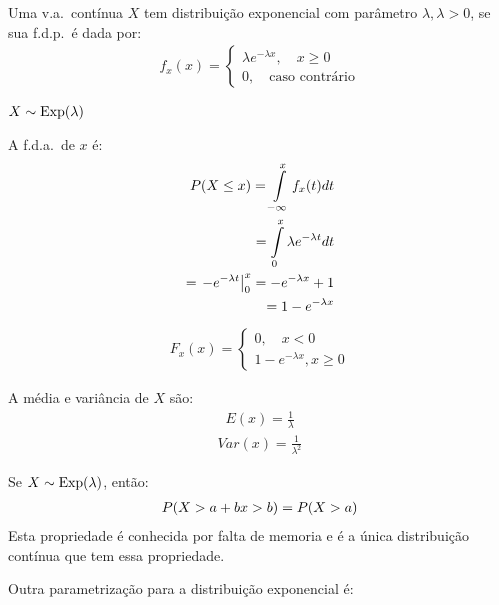 \begin{description}
  \item [Definição] Uma v.a.\ contínua $X$ tem distribuição exponencial com parâmetro $\lambda, \lambda>0$, se sua
    f.d.p.\ é dada por:
    \begin{align*}
      f_{x} (x)= \begin{cases}
        \lambda e^{- \lambda x} , \quad x \ge 0 \\
        0, \quad \text{caso contrário}
      \end{cases}
    \end{align*}
  \item[Notação] $X \sim \operatorname{Exp}(\lambda)$
    \begin{figure}[H]
      \centering
      
    \end{figure}
    \item A f.d.a.\ de $x$ é:
      \begin{align*}
        P(X \le x)  = \int \limits_{ -\infty }^{x} f_{x}(t)dt \\
        = \int \limits_{0}^{x} \lambda e^{-\lambda t } dt \\
        = \left.-e^{-\lambda t}\right\rvert_{0}^{x} = -e^{-\lambda x} +1\\
        = 1- e^{-\lambda x}
      \end{align*}
      \begin{align*}
        F_{x} (x) = \begin{cases}
         0, \quad x<0\\
         1-e^{-\lambda x} , x\ge 0
        \end{cases}
      \end{align*}
    \item A média e variância de $X$ são:
      \begin{align*}
        E(x) = \frac{1}{\lambda}
      \end{align*}
      \begin{align*}
        Var(x) = \frac{1}{\lambda^2}
      \end{align*}
    \item[Propriedade]
       Se $X \sim  \operatorname{Exp}(\lambda)$, então:
        \begin{align*}
          P(X> a+b  \/ x>b) = P(X > a)
        \end{align*}
        Esta propriedade é conhecida por falta de memoria e é a única distribuição 
        contínua que tem essa propriedade.
        \begin{obs}        Outra parametrização para a distribuição exponencial é:

\end{obs}
\end{description}
